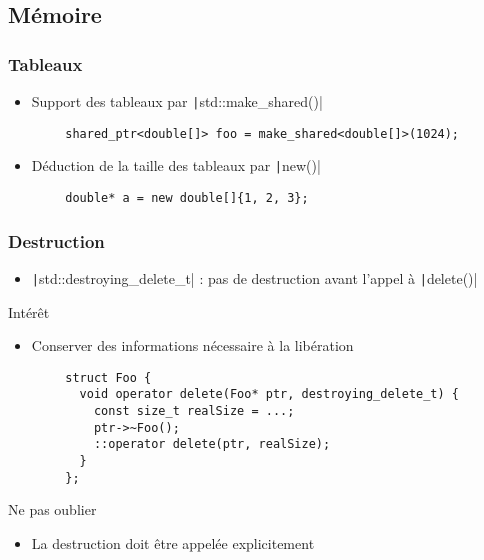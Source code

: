 \documentclass[C++.tex]{subfiles}
\begin{document}
\subsection*{Mémoire}
\begin{frame}[fragile]
	\frametitle{Tableaux}
	\begin{itemize}
		\item Support des tableaux par \texttt|std::make_shared()|
	\end{itemize}

	\begin{verbatim}
		shared_ptr<double[]> foo = make_shared<double[]>(1024);
	\end{verbatim}

	\begin{itemize}
		\item Déduction de la taille des tableaux par \texttt|new()|
	\end{itemize}

	\begin{verbatim}
		double* a = new double[]{1, 2, 3};
	\end{verbatim}

\end{frame}

\begin{frame}[fragile]
	\frametitle{Destruction}
	\begin{itemize}
		\item \texttt|std::destroying_delete_t| : pas de destruction avant l'appel à \texttt|delete()|
	\end{itemize}

	\begin{block}{Intérêt}
		\begin{itemize}
			\item Conserver des informations nécessaire à la libération
		\end{itemize}
	\end{block}

	\begin{verbatim}
		struct Foo {
		  void operator delete(Foo* ptr, destroying_delete_t) {
		    const size_t realSize = ...;
		    ptr->~Foo();
		    ::operator delete(ptr, realSize);
		  }
		};
	\end{verbatim}

	\begin{alertblock}{Ne pas oublier}
		\begin{itemize}
			\item La destruction doit être appelée explicitement
		\end{itemize}
	\end{alertblock}

\end{frame}
\end{document}
